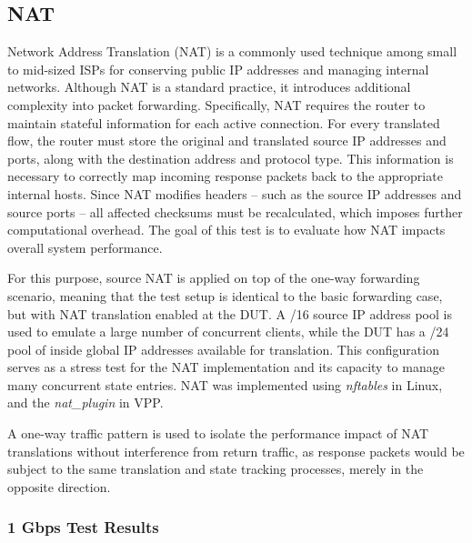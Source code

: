 \newpage
\subsection{NAT}
Network Address Translation (NAT) is a commonly used technique among small to mid-sized ISPs for conserving public IP addresses and managing internal networks. 
Although NAT is a standard practice, it introduces additional complexity into packet forwarding.
Specifically, NAT requires the router to maintain stateful information for each active connection. 
For every translated flow, the router must store the original and translated source IP addresses and ports, along with the destination address and protocol type. 
This information is necessary to correctly map incoming response packets back to the appropriate internal hosts.
Since NAT modifies headers -- such as the source IP addresses and source ports -- all affected checksums must be recalculated, which imposes further computational overhead.
The goal of this test is to evaluate how NAT impacts overall system performance.

For this purpose, source NAT is applied on top of the one-way forwarding scenario, meaning that the test setup is identical to the basic forwarding case, but with NAT translation enabled at the DUT. 
A /16 source IP address pool is used to emulate a large number of concurrent clients, while the DUT has a /24 pool of inside global IP addresses available for translation. 
This configuration serves as a stress test for the NAT implementation and its capacity to manage many concurrent state entries.
NAT was implemented using \textit{nftables} in Linux, and the \textit{nat\_plugin} in VPP.

A one-way traffic pattern is used to isolate the performance impact of NAT translations without interference from return traffic, 
as response packets would be subject to the same translation and state tracking processes, merely in the opposite direction.

\subsubsection{1 Gbps Test Results}

